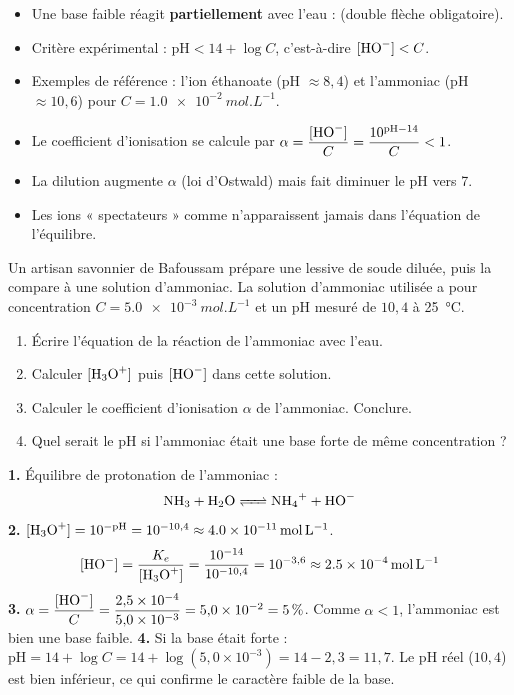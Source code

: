 \documentclass[11pt]{article}
\newcommand{\cle}[1]{{\popxbold\color{popdark}#1}}
\begin{document}
\begin{aretenir}
\begin{itemize}
\item Une \cle{base faible} réagit \textbf{partiellement} avec l'eau :  (double flèche obligatoire).
\item Critère expérimental : $\mathrm{pH} < 14 + \log C$, c'est-à-dire $[\ce{HO-}] < C$.
\item Exemples de référence : l'ion éthanoate  (pH $\approx 8{,}4$) et l'ammoniac  (pH $\approx 10{,}6$) pour $C = \SI{1,0e-2}{mol.L^{-1}}$.
\item Le coefficient d'ionisation se calcule par $\alpha = \dfrac{[\ce{HO-}]}{C} = \dfrac{10^{\mathrm{pH}-14}}{C} < 1$.
\item La dilution augmente $\alpha$ (loi d'Ostwald) mais fait diminuer le pH vers 7.
\item Les ions « spectateurs » comme  n'apparaissent jamais dans l'équation de l'équilibre.
\end{itemize}
\end{aretenir}

\begin{exercice}
Un artisan savonnier de Bafoussam prépare une lessive de soude diluée, puis la compare à une solution d'ammoniac. La solution d'ammoniac utilisée a pour concentration $C = \SI{5,0e-3}{mol.L^{-1}}$ et un pH mesuré de $10{,}4$ à \SI{25}{\celsius}.
\begin{enumerate}
\item Écrire l'équation de la réaction de l'ammoniac avec l'eau.
\item Calculer $[\ce{H3O+}]$ puis $[\ce{HO-}]$ dans cette solution.
\item Calculer le coefficient d'ionisation $\alpha$ de l'ammoniac. Conclure.
\item Quel serait le pH si l'ammoniac était une base forte de même concentration ?
\end{enumerate}
\end{exercice}

\begin{corrige}
\textbf{1.} Équilibre de protonation de l'ammoniac :
\[ \ce{NH3 + H2O <=> NH4+ + HO-} \]
\textbf{2.} $[\ce{H3O+}] = 10^{-\mathrm{pH}} = 10^{-10{,}4} \approx \SI{4,0e-11}{mol.L^{-1}}$.
\[ [\ce{HO-}] = \frac{K_e}{[\ce{H3O+}]} = \frac{10^{-14}}{10^{-10{,}4}} = 10^{-3{,}6} \approx \SI{2,5e-4}{mol.L^{-1}} \]
\textbf{3.} $\alpha = \dfrac{[\ce{HO-}]}{C} = \dfrac{2{,}5 \times 10^{-4}}{5{,}0 \times 10^{-3}} = 5{,}0 \times 10^{-2} = 5\,\%$. Comme $\alpha < 1$, l'ammoniac est bien une base faible.
\textbf{4.} Si la base était forte : $\mathrm{pH} = 14 + \log C = 14 + \log(5{,}0 \times 10^{-3}) = 14 - 2{,}3 = 11{,}7$. Le pH réel ($10{,}4$) est bien inférieur, ce qui confirme le caractère faible de la base.
\end{corrige}
\end{document}
